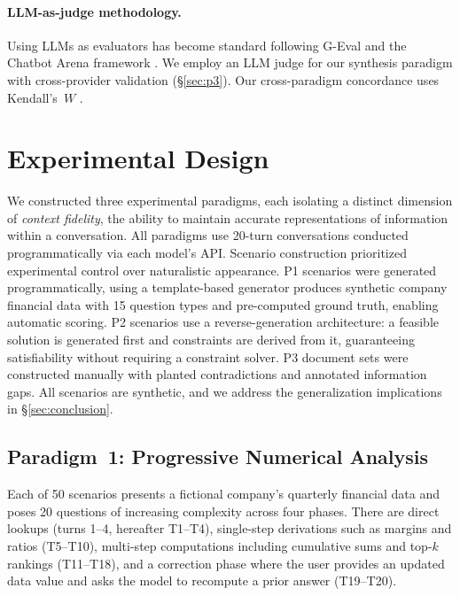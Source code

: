 \documentclass[11pt,a4paper]{article}
\begin{document}
\paragraph{LLM-as-judge methodology.}
Using LLMs as evaluators has become standard following G-Eval \citep{liu2023geval} and the Chatbot Arena framework \citep{chiang2024chatbot}. We employ an LLM judge for our synthesis paradigm with cross-provider validation (\S\ref{sec:p3}). Our cross-paradigm concordance uses Kendall's~$W$ \citep{kendall1939problem}.

\section{Experimental Design}
\label{sec:design}

We constructed three experimental paradigms, each isolating a distinct dimension of \emph{context fidelity}, the ability to maintain accurate representations of information within a conversation. All paradigms use 20-turn conversations conducted programmatically via each model's API. Scenario construction prioritized experimental control over naturalistic appearance. P1 scenarios were generated programmatically, using a template-based generator produces synthetic company financial data with 15 question types and pre-computed ground truth, enabling automatic scoring. P2 scenarios use a reverse-generation architecture: a feasible solution is generated first and constraints are derived from it, guaranteeing satisfiability without requiring a constraint solver. P3 document sets were constructed manually with planted contradictions and annotated information gaps. All scenarios are synthetic, and we address the generalization implications in \S\ref{sec:conclusion}.

\subsection{Paradigm~1: Progressive Numerical Analysis}
\label{sec:p1}

Each of 50 scenarios presents a fictional company's quarterly financial data and poses 20 questions of increasing complexity across four phases. There are direct lookups (turns 1--4, hereafter T1--T4), single-step derivations such as margins and ratios (T5--T10), multi-step computations including cumulative sums and top-$k$ rankings (T11--T18), and a correction phase where the user provides an updated data value and asks the model to recompute a prior answer (T19--T20).
\end{document}
